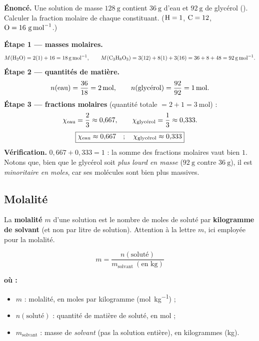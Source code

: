 \documentclass[11pt,a4paper]{article}
\newenvironment{ou}{%
  \par\smallskip\noindent\textbf{où :}\nopagebreak
  \begin{itemize}[leftmargin=1.8em,topsep=2pt,itemsep=1.5pt,parsep=0pt]}%
  {\end{itemize}}
\begin{document}
\begin{exemple}\label{ex:frac}
\textbf{Énoncé.} Une solution de masse $\SI{128}{\gram}$ contient $\SI{36}{\gram}$ d'eau et
$\SI{92}{\gram}$ de glycérol  (). Calculer la fraction molaire de
chaque constituant. ($\ce{H}=1$, $\ce{C}=12$, $\ce{O}=16\ \si{\gram\per\mole}$.)

\smallskip
\textbf{Étape 1 — masses molaires.}
\[ M(\ce{H2O}) = 2(1)+16 = \SI{18}{\gram\per\mole}, \qquad
   M(\ce{C3H8O3}) = 3(12)+8(1)+3(16) = 36+8+48 = \SI{92}{\gram\per\mole}. \]
\textbf{Étape 2 — quantités de matière.}
\[ n(\ce{eau}) = \frac{36}{18} = \SI{2}{\mole}, \qquad n(\text{glycérol}) = \frac{92}{92} = \SI{1}{\mole}. \]
\textbf{Étape 3 — fractions molaires} (quantité totale $= 2+1 = \SI{3}{\mole}$) :
\[ \chi_{\ce{eau}} = \frac{2}{3} \approx 0{,}667, \qquad \chi_{\text{glycérol}} = \frac{1}{3} \approx 0{,}333. \]
\[ \boxed{\chi_{\ce{eau}} \approx 0{,}667 \quad ; \quad \chi_{\text{glycérol}} \approx 0{,}333} \]
\textbf{Vérification.} $0{,}667 + 0{,}333 = 1$ : la somme des fractions molaires vaut bien $1$.
Notons que, bien que le glycérol soit \emph{plus lourd en masse} ($\SI{92}{\gram}$ contre
$\SI{36}{\gram}$), il est \emph{minoritaire en moles}, car ses molécules sont bien plus massives.
\end{exemple}

\subsection{Molalité}

\begin{definition}[molalité]
La \textbf{molalité} $m$ d'une solution est le nombre de moles de soluté par \textbf{kilogramme de
solvant} (et non par litre de solution). Attention à la lettre $m$, ici employée pour la molalité.
\end{definition}

\begin{formule}[molalité]
\[ \boxed{\,m = \dfrac{n(\text{soluté})}{m_{\text{solvant}}\ (\text{en kg})}\,} \]
\begin{ou}
  \item $m$ : molalité, en moles par kilogramme (\si{\mole\per\kilo\gram}) ;
  \item $n(\text{soluté})$ : quantité de matière de soluté, en \si{\mole} ;
  \item $m_{\text{solvant}}$ : masse de \emph{solvant} (pas la solution entière), en kilogrammes (\si{\kilo\gram}).
\end{ou}
\end{formule}
\end{document}
